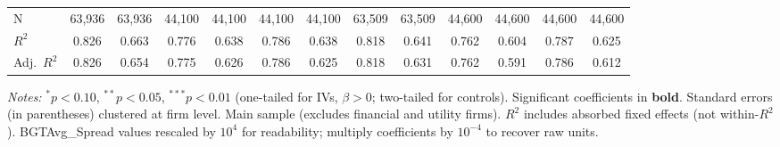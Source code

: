 \begin{landscape}
\begin{table}[H]
\begin{tabular}{lcccccccccccc}
\midrule
N & 63,936 & 63,936 & 44,100 & 44,100 & 44,100 & 44,100 & 63,509 & 63,509 & 44,600 & 44,600 & 44,600 & 44,600 \\
$R^2$ & 0.826 & 0.663 & 0.776 & 0.638 & 0.786 & 0.638 & 0.818 & 0.641 & 0.762 & 0.604 & 0.787 & 0.625 \\
Adj.~$R^2$ & 0.826 & 0.654 & 0.775 & 0.626 & 0.786 & 0.625 & 0.818 & 0.631 & 0.762 & 0.591 & 0.786 & 0.612 \\
\bottomrule
\end{tabular}
\begin{minipage}{\linewidth}
\vspace{2pt}\scriptsize
\textit{Notes:} $^{*}p<0.10$, $^{**}p<0.05$, $^{***}p<0.01$ (one-tailed for IVs, $\beta > 0$; two-tailed for controls).
 Significant coefficients in \textbf{bold}.
 Standard errors (in parentheses) clustered at firm level.
 Main sample (excludes financial and utility firms).
 $R^2$ includes absorbed fixed effects (not within-$R^2$).
 BGTAvg\_Spread values rescaled by $10^4$ for readability; multiply coefficients by $10^{-4}$ to recover raw units.
\end{minipage}
\end{table}
\end{landscape}